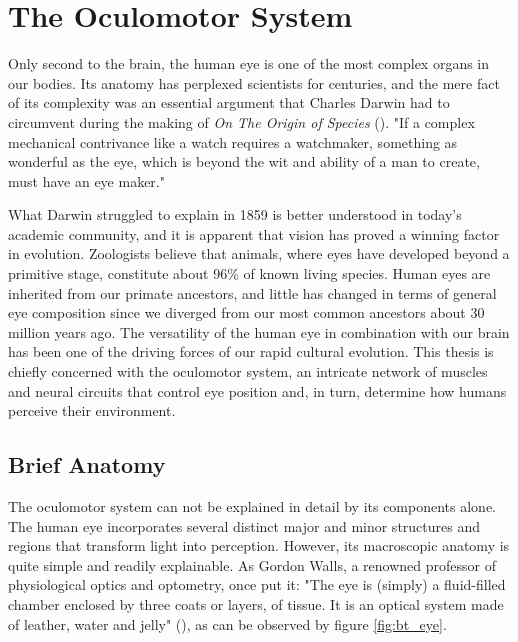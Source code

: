 \section{The Oculomotor System} \label{sec:bt_TheOculomotorSystem}

Only second to the brain, the human eye is one of the most complex organs in our bodies. Its anatomy has perplexed scientists for centuries, and the mere fact of its complexity was an essential argument that Charles Darwin had to circumvent during the making of \textit{On The Origin of Species} (\cite{oyster1999}). "If a complex mechanical contrivance like a watch requires a watchmaker, something as wonderful as the eye, which is beyond the wit and ability of a man to create, must have an eye maker." 

What Darwin struggled to explain in 1859 is better understood in today's academic community, and it is apparent that vision has proved a winning factor in evolution. Zoologists believe that animals, where eyes have developed beyond a primitive stage, constitute about 96\% of known living species. Human eyes are inherited from our primate ancestors, and little has changed in terms of general eye composition since we diverged from our most common ancestors about 30 million years ago. The versatility of the human eye in combination with our brain has been one of the driving forces of our rapid cultural evolution. This thesis is chiefly concerned with the oculomotor system, an intricate network of muscles and neural circuits that control eye position and, in turn, determine how humans perceive their environment.

\subsection{Brief Anatomy}
The oculomotor system can not be explained in detail by its components alone. The human eye incorporates several distinct major and minor structures and regions that transform light into perception. However, its macroscopic anatomy is quite simple and readily explainable. As Gordon Walls, a renowned professor of physiological optics and optometry, once put it: "The eye is (simply) a fluid-filled chamber enclosed by three coats or layers, of tissue. It is an optical system made of leather, water and jelly" (\cite{oyster1999}), as can be observed by figure \ref{fig:bt_eye}.


